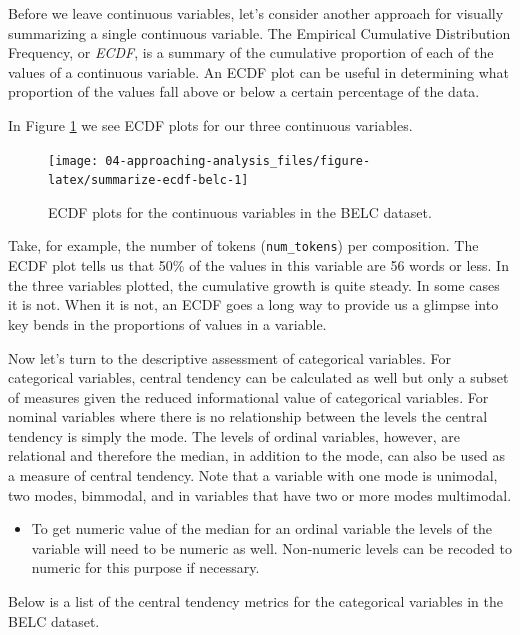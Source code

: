 \documentclass[
]{article}
\newenvironment{rmdblock}[1]
  {\begin{shaded*}
  \begin{itemize}
  \renewcommand{\labelitemi}{
    \raisebox{-.5\height}[0pt][0pt]{
      {\setkeys{Gin}{width=2em,keepaspectratio}\texttt{[image: assets/images/\#1]}}
    }
  }
  \item
  }
  {
  \end{itemize}
  \end{shaded*}
  }
\newenvironment{rmdwarning}
  {\begin{rmdblock}{warning}}
  {\end{rmdblock}}
\begin{document}
Before we leave continuous variables, let's consider another approach for visually summarizing a single continuous variable. The Empirical Cumulative Distribution Frequency, or \emph{ECDF}, is a summary of the cumulative proportion of each of the values of a continuous variable. An ECDF plot can be useful in determining what proportion of the values fall above or below a certain percentage of the data.

In Figure \ref{fig:summarize-ecdf-belc} we see ECDF plots for our three continuous variables.

\begin{figure}

{\centering \texttt{[image: 04-approaching-analysis\_files/figure-latex/summarize-ecdf-belc-1]} 

}

\caption{ECDF plots for the continuous variables in the BELC dataset.}\label{fig:summarize-ecdf-belc}
\end{figure}

Take, for example, the number of tokens (\texttt{num\_tokens}) per composition. The ECDF plot tells us that 50\% of the values in this variable are 56 words or less. In the three variables plotted, the cumulative growth is quite steady. In some cases it is not. When it is not, an ECDF goes a long way to provide us a glimpse into key bends in the proportions of values in a variable.

Now let's turn to the descriptive assessment of categorical variables. For categorical variables, central tendency can be calculated as well but only a subset of measures given the reduced informational value of categorical variables. For nominal variables where there is no relationship between the levels the central tendency is simply the mode. The levels of ordinal variables, however, are relational and therefore the median, in addition to the mode, can also be used as a measure of central tendency. Note that a variable with one mode is unimodal, two modes, bimmodal, and in variables that have two or more modes multimodal.

\begin{rmdwarning}
To get numeric value of the median for an ordinal variable the levels of
the variable will need to be numeric as well. Non-numeric levels can be
recoded to numeric for this purpose if necessary.
\end{rmdwarning}

Below is a list of the central tendency metrics for the categorical variables in the BELC dataset.
\end{document}
